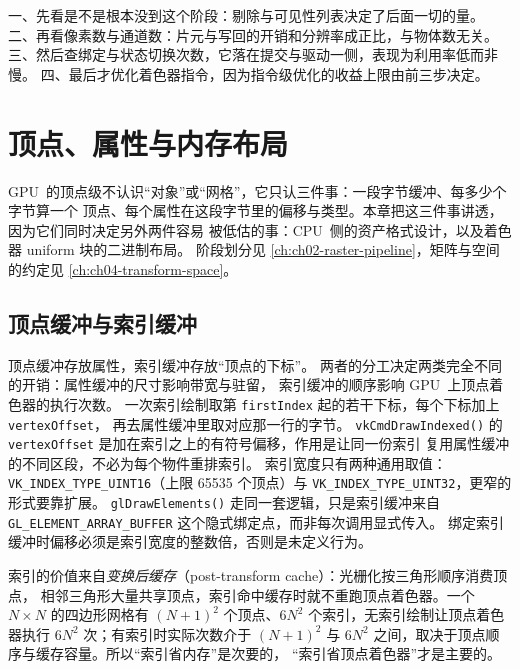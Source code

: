 \documentclass[12pt,a4paper,fontset=fandol]{ctexbook}
\newcommand{\Fn}[1]{\texttt{#1()}}
\newcommand{\Tp}[1]{\texttt{#1}}
\newcommand{\Bk}{\discretionary{}{}{}}
\newcommand{\Lang}[1]{\textsf{#1}}
\newcommand{\DomCPU}{\Lang{CPU}}
\newcommand{\DomGPU}{\Lang{GPU}}
\begin{document}
\begin{bestpractice}[title={按阶段定位问题的四步顺序}]
一、先看是不是根本没到这个阶段：剔除与可见性列表决定了后面一切的量。
二、再看像素数与通道数：片元与写回的开销和分辨率成正比，与物体数无关。
三、然后查绑定与状态切换次数，它落在提交与驱动一侧，表现为利用率低而非慢。
四、最后才优化着色器指令，因为指令级优化的收益上限由前三步决定。
\end{bestpractice}

\chapter{顶点、属性与内存布局}
\label{ch:ch03-vertex-input}

\DomGPU\ 的顶点级不认识``对象''或``网格''，它只认三件事：一段字节缓冲、每多少个字节算一个
顶点、每个属性在这段字节里的偏移与类型。本章把这三件事讲透，因为它们同时决定另外两件容易
被低估的事：\DomCPU\ 侧的资产格式设计，以及着色器 uniform 块的二进制布局。
阶段划分见 \ref{ch:ch02-raster-pipeline}，矩阵与空间的约定见 \ref{ch:ch04-transform-space}。

\section{顶点缓冲与索引缓冲}

顶点缓冲存放属性，索引缓冲存放``顶点的下标''。
两者的分工决定两类完全不同的开销：属性缓冲的尺寸影响带宽与驻留，
索引缓冲的顺序影响 \DomGPU\ 上顶点着色器的执行次数。
一次索引绘制取第 \Tp{firstIndex} 起的若干下标，每个下标加上 \Tp{vertexOffset}，
再去属性缓冲里取对应那一行的字节。
\Fn{vkCmdDrawIndexed} 的 \Tp{vertexOffset} 是加在索引之上的有符号偏移，作用是让同一份索引
复用属性缓冲的不同区段，不必为每个物件重排索引。
索引宽度只有两种通用取值：\Tp{VK\_INDEX\_\Bk TYPE\_UINT16}（上限 65535 个顶点）与
\Tp{VK\_INDEX\_\Bk TYPE\_UINT32}，更窄的形式要靠扩展。
\Fn{glDrawElements} 走同一套逻辑，只是索引缓冲来自
\Tp{GL\_ELEMENT\_\Bk ARRAY\_BUFFER} 这个隐式绑定点，而非每次调用显式传入。
绑定索引缓冲时偏移必须是索引宽度的整数倍，否则是未定义行为。

索引的价值来自\emph{变换后缓存}（post-transform cache）：光栅化按三角形顺序消费顶点，
相邻三角形大量共享顶点，索引命中缓存时就不重跑顶点着色器。一个 $N \times N$ 的四边形网格有
$(N+1)^2$ 个顶点、$6N^2$ 个索引，无索引绘制让顶点着色器执行 $6N^2$ 次；有索引时实际次数介于
$(N+1)^2$ 与 $6N^2$ 之间，取决于顶点顺序与缓存容量。所以``索引省内存''是次要的，
``索引省顶点着色器''才是主要的。
\end{document}
